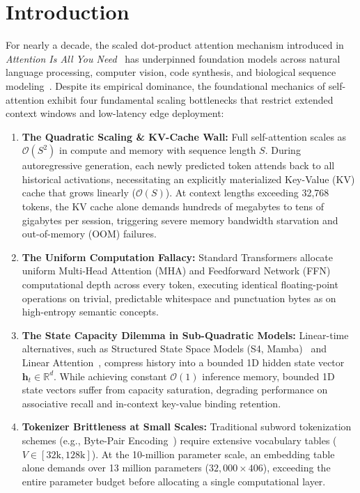 \documentclass[10pt,twocolumn,letterpaper]{article}
\begin{document}
\section{Introduction}
\label{sec:intro}

For nearly a decade, the scaled dot-product attention mechanism introduced in \textit{Attention Is All You Need}~\cite{vaswani2017attention} has underpinned foundation models across natural language processing, computer vision, code synthesis, and biological sequence modeling~\cite{radford2019gpt2,brown2020gpt3,touvron2023llama}. Despite its empirical dominance, the foundational mechanics of self-attention exhibit four fundamental scaling bottlenecks that restrict extended context windows and low-latency edge deployment:

\begin{enumerate}[leftmargin=*]
    \item \textbf{The Quadratic Scaling \& KV-Cache Wall:} Full self-attention scales as $\mathcal{O}(S^2)$ in compute and memory with sequence length $S$. During autoregressive generation, each newly predicted token attends back to all historical activations, necessitating an explicitly materialized Key-Value (KV) cache that grows linearly ($\mathcal{O}(S)$). At context lengths exceeding 32,768 tokens, the KV cache alone demands hundreds of megabytes to tens of gigabytes per session, triggering severe memory bandwidth starvation and out-of-memory (OOM) failures.
    \item \textbf{The Uniform Computation Fallacy:} Standard Transformers allocate uniform Multi-Head Attention (MHA) and Feedforward Network (FFN) computational depth across every token, executing identical floating-point operations on trivial, predictable whitespace and punctuation bytes as on high-entropy semantic concepts.
    \item \textbf{The State Capacity Dilemma in Sub-Quadratic Models:} Linear-time alternatives, such as Structured State Space Models (S4, Mamba)~\cite{gu2021s4,gu2023mamba} and Linear Attention~\cite{katharopoulos2020transformers}, compress history into a bounded 1D hidden state vector $\mathbf{h}_t \in \mathbb{R}^d$. While achieving constant $\mathcal{O}(1)$ inference memory, bounded 1D state vectors suffer from capacity saturation, degrading performance on associative recall and in-context key-value binding retention.
    \item \textbf{Tokenizer Brittleness at Small Scales:} Traditional subword tokenization schemes (e.g., Byte-Pair Encoding~\cite{sennrich2016bpe}) require extensive vocabulary tables ($V \in [32\text{k}, 128\text{k}]$). At the 10-million parameter scale, an embedding table alone demands over 13 million parameters ($32,000 \times 406$), exceeding the entire parameter budget before allocating a single computational layer.
\end{enumerate}
\end{document}
